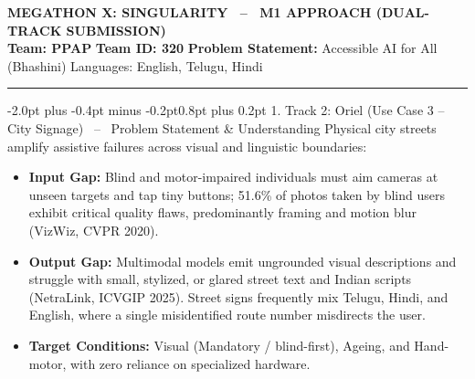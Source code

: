 \documentclass[10pt,a4paper]{article}
\makeatletter
\renewcommand{\section}{\@startsection{section}{1}{\z@}%
  {-2.0pt plus -0.4pt minus -0.2pt}{0.8pt plus 0.2pt}%
  {\normalfont\footnotesize\bfseries\scshape}}
\makeatother
\begin{document}
\clearpage


\begin{center}
  {\normalsize\bfseries MEGATHON X: SINGULARITY \ -- \ M1 APPROACH (DUAL-TRACK SUBMISSION)}\\[0.5pt]
  {\scriptsize\textbf{Team: PPAP} \quad\textbar\quad \textbf{Team ID: 320} \quad\textbar\quad \textbf{Problem Statement:} Accessible AI for All (Bhashini) \quad\textbar\quad Languages: English, Telugu, Hindi}\\[0.5pt]
  \rule{\textwidth}{0.6pt}
\end{center}

\vspace{-4pt}
\noindent{}
\vspace{-2pt}

\section{1. Track 2: Oriel (Use Case 3 -- City Signage) \ -- \ Problem Statement \& Understanding}
Physical city streets amplify assistive failures across visual and linguistic boundaries:
\begin{itemize}\setlength{\itemsep}{0.2pt}\setlength{\topsep}{0.2pt}\setlength{\leftmargin}{1.1em}
  \item \textbf{Input Gap:} Blind and motor-impaired individuals must aim cameras at unseen targets and tap tiny buttons; 51.6\% of photos taken by blind users exhibit critical quality flaws, predominantly framing and motion blur (VizWiz, CVPR 2020).
  \item \textbf{Output Gap:} Multimodal models emit ungrounded visual descriptions and struggle with small, stylized, or glared street text and Indian scripts (NetraLink, ICVGIP 2025). Street signs frequently mix Telugu, Hindi, and English, where a single misidentified route number misdirects the user.
  \item \textbf{Target Conditions:} Visual (Mandatory / blind-first), Ageing, and Hand-motor, with zero reliance on specialized hardware.
\end{itemize}
\end{document}
